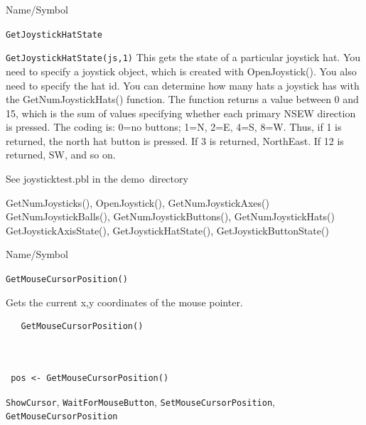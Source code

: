 \begin{desc}{Name/Symbol}
\item[Name/Symbol] \verb+GetJoystickHatState+ 

\item[Description]  

\item[Usage]        \verb+GetJoystickHatState(js,1)+ 
  This gets the state of a particular joystick hat.  You need to specify a joystick object, which is created with OpenJoystick().  You also need to specify the hat id.  You can determine how many hats a joystick has with the GetNumJoystickHats() function.  The function returns a value between 0 and 15, which is the sum of values specifying whether each primary NSEW direction is pressed.  The coding is: 0=no buttons; 1=N, 2=E, 4=S, 8=W.  Thus, if 1 is returned, the north hat button is pressed.  If 3 is returned, NorthEast.  If 12 is returned, SW, and so on.
  
\item[Example]
See joysticktest.pbl in the demo\ directory

\item[See Also]
GetNumJoysticks(), OpenJoystick(), GetNumJoystickAxes()
GetNumJoystickBalls(), GetNumJoystickButtons(), GetNumJoystickHats()
GetJoystickAxisState(), GetJoystickHatState(), GetJoystickButtonState()
\end{desc} 


\begin{desc}{Name/Symbol}
\item[Name/Symbol]	\verb+GetMouseCursorPosition()+

\item[Description] Gets the current x,y coordinates of the mouse
  pointer.

\item[Usage]
\begin{verbatim}
   GetMouseCursorPosition()
\end{verbatim}

\item[Example]	
\begin{verbatim}


 pos <- GetMouseCursorPosition()
\end{verbatim}


\item[See Also]
  \verb+ShowCursor+, \verb+WaitForMouseButton+,
  \verb+SetMouseCursorPosition+, \verb+GetMouseCursorPosition+
\end{desc}


